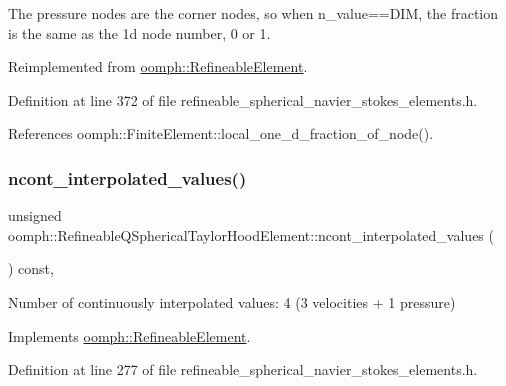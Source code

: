 The pressure nodes are the corner nodes, so when n\+\_\+value==D\+IM, the fraction is the same as the 1d node number, 0 or 1. 



Reimplemented from \hyperlink{classoomph_1_1RefineableElement_ac4e4ae5374154855ae9b072c6269f76e}{oomph\+::\+Refineable\+Element}.



Definition at line 372 of file refineable\+\_\+spherical\+\_\+navier\+\_\+stokes\+\_\+elements.\+h.



References oomph\+::\+Finite\+Element\+::local\+\_\+one\+\_\+d\+\_\+fraction\+\_\+of\+\_\+node().

\mbox{\label{classoomph_1_1RefineableQSphericalTaylorHoodElement_a613dbf83fb63f7a6cfee3bee9336b99d}} 
\subsubsection{\texorpdfstring{ncont\+\_\+interpolated\+\_\+values()}{ncont\_interpolated\_values()}}
{\footnotesize\ttfamily unsigned oomph\+::\+Refineable\+Q\+Spherical\+Taylor\+Hood\+Element\+::ncont\+\_\+interpolated\+\_\+values (\begin{DoxyParamCaption}{ }\end{DoxyParamCaption}) const\hspace{0.3cm}{\ttfamily [inline]}, {\ttfamily [virtual]}}



Number of continuously interpolated values\+: 4 (3 velocities + 1 pressure) 



Implements \hyperlink{classoomph_1_1RefineableElement_a53e171a18c9f43f1db90a6876516a073}{oomph\+::\+Refineable\+Element}.



Definition at line 277 of file refineable\+\_\+spherical\+\_\+navier\+\_\+stokes\+\_\+elements.\+h.

\mbox{\label{classoomph_1_1RefineableQSphericalTaylorHoodElement_a91dfb940844c5bf3ba6af5ed10d683f2}} 
